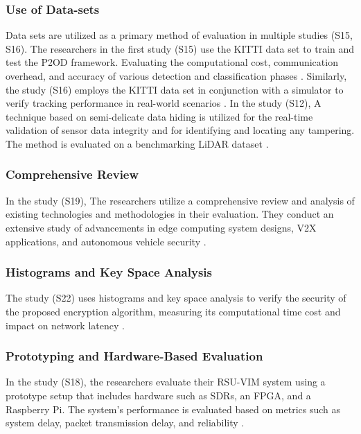 \documentclass[a4paper,12pt]{article}
\begin{document}
\subsubsection{Use of Data-sets}
\hspace{5mm} Data sets are utilized as a primary method of evaluation in multiple studies (S15, S16). The researchers in the first study (S15) use the KITTI data set to train and test the P2OD framework. Evaluating the computational cost, communication overhead, and accuracy of various detection and classification phases \cite{s15}. Similarly, the study (S16) employs the KITTI data set in conjunction with a simulator to verify tracking performance in real-world scenarios \cite{s16}. In the study (S12), A technique based on semi-delicate data hiding is utilized for the real-time validation of sensor data integrity and for identifying and locating any tampering. The method is evaluated on a benchmarking LiDAR dataset \cite{s12}.

\subsubsection{Comprehensive Review}
\hspace{5mm} In the study (S19), The researchers utilize a comprehensive review and analysis of existing technologies and methodologies in their evaluation. They conduct an extensive study of advancements in edge computing system designs, V2X applications, and autonomous vehicle security \cite{s19}.

\subsubsection{Histograms and Key Space Analysis}
\hspace{5mm} The study (S22) uses histograms and key space analysis to verify the security of the proposed encryption algorithm, measuring its computational time cost and impact on network latency \cite{s22}.

\subsubsection{Prototyping and Hardware-Based Evaluation}
\hspace{5mm} In the study (S18), the researchers evaluate their RSU-VIM system using a prototype setup that includes hardware such as SDRs, an FPGA, and a Raspberry Pi. The system's performance is evaluated based on metrics such as system delay, packet transmission delay, and reliability \cite{s18}.
\end{document}
